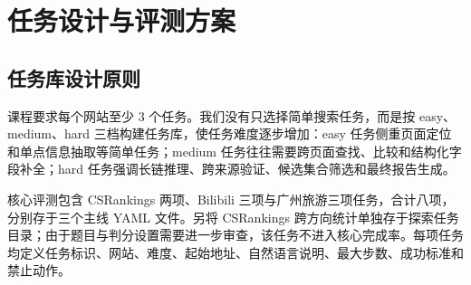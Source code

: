 
\section{任务设计与评测方案}

\subsection{任务库设计原则}

课程要求每个网站至少 3 个任务。我们没有只选择简单搜索任务，而是按 easy、medium、hard 三档构建任务库，使任务难度逐步增加：easy 任务侧重页面定位和单点信息抽取等简单任务；medium 任务往往需要跨页面查找、比较和结构化字段补全；hard 任务强调长链推理、跨来源验证、候选集合筛选和最终报告生成。

核心评测包含 CSRankings 两项、Bilibili 三项与广州旅游三项任务，合计八项，分别存于三个主线 YAML 文件。另将 CSRankings 跨方向统计单独存于探索任务目录；由于题目与判分设置需要进一步审查，该任务不进入核心完成率。每项任务均定义任务标识、网站、难度、起始地址、自然语言说明、最大步数、成功标准和禁止动作。

